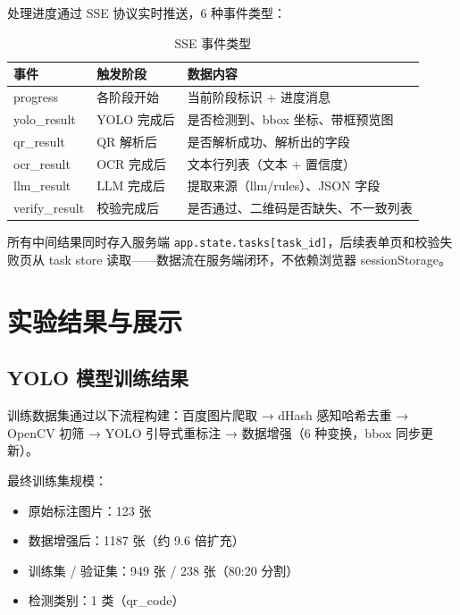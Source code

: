 \documentclass[12pt,a4paper]{ctexart}
\begin{document}
处理进度通过 SSE 协议实时推送，6 种事件类型：

\begin{table}[H]
\centering
\begin{tabular}{lp{4cm} p{6cm}}
\toprule
\textbf{事件} & \textbf{触发阶段} & \textbf{数据内容} \\
\midrule
progress      & 各阶段开始  & 当前阶段标识 + 进度消息 \\
yolo\_result  & YOLO 完成后 & 是否检测到、bbox 坐标、带框预览图 \\
qr\_result    & QR 解析后   & 是否解析成功、解析出的字段 \\
ocr\_result   & OCR 完成后  & 文本行列表（文本 + 置信度） \\
llm\_result   & LLM 完成后  & 提取来源（llm/rules）、JSON 字段 \\
verify\_result & 校验完成后 & 是否通过、二维码是否缺失、不一致列表 \\
\bottomrule
\end{tabular}
\caption{SSE 事件类型}
\label{tab:sse}
\end{table}

所有中间结果同时存入服务端 \texttt{app.state.tasks[task\_id]}，后续表单页和校验失败页从 task store 读取——数据流在服务端闭环，不依赖浏览器 sessionStorage。


\section{实验结果与展示}

\subsection{YOLO 模型训练结果}

训练数据集通过以下流程构建：百度图片爬取 → dHash 感知哈希去重 → OpenCV 初筛 → YOLO 引导式重标注 → 数据增强（6 种变换，bbox 同步更新）。

最终训练集规模：
\begin{itemize}
  \item 原始标注图片：123 张
  \item 数据增强后：1187 张（约 9.6 倍扩充）
  \item 训练集 / 验证集：949 张 / 238 张（80:20 分割）
  \item 检测类别：1 类（qr\_code）
\end{itemize}
\end{document}
